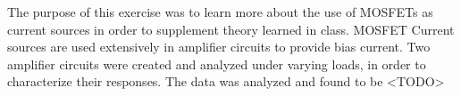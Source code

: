 
\def \labnum	{\#3}
\def \tonames   {Tyler Nicholson}
\def \disptitle	{MOSFET Current Sources}
\def \datestart	{03-20-2015}
\def \dateend	{04-03-2015}






The purpose of this exercise was to learn more about the use of MOSFETs as current sources in order to supplement theory learned in class. 
MOSFET Current sources are used extensively in amplifier circuits to provide bias current. 
Two amplifier circuits were created and analyzed under varying loads, in order to characterize their responses. 
The data was analyzed and found to be <TODO>







